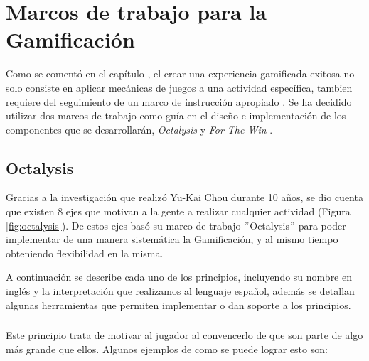 \section{Marcos de trabajo para la Gamificación}

 Como se comentó en el capítulo , el crear una experiencia
 gamificada exitosa no solo consiste en aplicar mecánicas de juegos a una actividad
 específica, tambien requiere del seguimiento de un marco de instrucción apropiado \cite[p. 1110]{GamInE-Learning}.
 Se ha decidido utilizar dos marcos de trabajo como guía en el diseño e implementación
 de los componentes que se desarrollarán, {\it Octalysis} \cite{Octalysis} y
 {\it For The Win} \cite{FrameWorkForTheWin}.

\subsection{Octalysis}
\label{sec:octalysis}

 Gracias a la investigación que realizó Yu-Kai Chou durante 10 años,
 se dio cuenta que existen 8 ejes que motivan a la gente a realizar cualquier actividad (Figura \ref{fig:octalysis}). De estos ejes basó su marco de trabajo $"$Octalysis$"$ para poder implementar de una manera sistemática la Gamificación, y al mismo tiempo obteniendo flexibilidad en la misma.
    
    
\noindent A continuación se describe cada uno de los principios, incluyendo su nombre en inglés y la interpretación que realizamos al lenguaje español, además se detallan algunas herramientas que permiten implementar o dan soporte a los principios.
    
    \subsubsection{\principioI}
    \label{subsec:principioI}
  
    Este principio trata de motivar al jugador al convencerlo de que son parte de algo más grande que ellos.\cite[p. 66]{libro2} Algunos ejemplos de como se puede lograr esto son:
    
